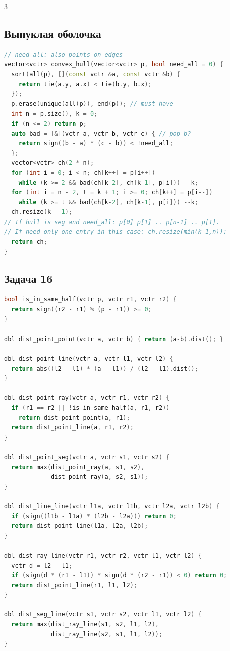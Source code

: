 \documentclass[8pt,a4paper,landscape,twosided]{extarticle}
\begin{document}
\begin{multicols*}{3}
\subsection{Выпуклая оболочка}
\begin{lstlisting}[language=C++]
// need_all: also points on edges
vector<vctr> convex_hull(vector<vctr> p, bool need_all = 0) {
  sort(all(p), [](const vctr &a, const vctr &b) {
    return tie(a.y, a.x) < tie(b.y, b.x);
  });
  p.erase(unique(all(p)), end(p)); // must have
  int n = p.size(), k = 0;
  if (n <= 2) return p;
  auto bad = [&](vctr a, vctr b, vctr c) { // pop b?
    return sign((b - a) * (c - b)) < !need_all;
  };
  vector<vctr> ch(2 * n);
  for (int i = 0; i < n; ch[k++] = p[i++])
    while (k >= 2 && bad(ch[k-2], ch[k-1], p[i])) --k;
  for (int i = n - 2, t = k + 1; i >= 0; ch[k++] = p[i--])
    while (k >= t && bad(ch[k-2], ch[k-1], p[i])) --k;
  ch.resize(k - 1);
// If hull is seg and need_all: p[0] p[1] .. p[n-1] .. p[1].
// If need only one entry in this case: ch.resize(min(k-1,n));
  return ch;
}
\end{lstlisting}

\subsection{Задача 16}
\begin{lstlisting}[language=C++]
bool is_in_same_half(vctr p, vctr r1, vctr r2) {
  return sign((r2 - r1) % (p - r1)) >= 0;
}

dbl dist_point_point(vctr a, vctr b) { return (a-b).dist(); }

dbl dist_point_line(vctr a, vctr l1, vctr l2) {
  return abs((l2 - l1) * (a - l1)) / (l2 - l1).dist();
}

dbl dist_point_ray(vctr a, vctr r1, vctr r2) {
  if (r1 == r2 || !is_in_same_half(a, r1, r2))
    return dist_point_point(a, r1);
  return dist_point_line(a, r1, r2);
}

dbl dist_point_seg(vctr a, vctr s1, vctr s2) {
  return max(dist_point_ray(a, s1, s2),
             dist_point_ray(a, s2, s1));
}

dbl dist_line_line(vctr l1a, vctr l1b, vctr l2a, vctr l2b) {
  if (sign((l1b - l1a) * (l2b - l2a))) return 0;
  return dist_point_line(l1a, l2a, l2b);
}

dbl dist_ray_line(vctr r1, vctr r2, vctr l1, vctr l2) {
  vctr d = l2 - l1;
  if (sign(d * (r1 - l1)) * sign(d * (r2 - r1)) < 0) return 0;
  return dist_point_line(r1, l1, l2);
}

dbl dist_seg_line(vctr s1, vctr s2, vctr l1, vctr l2) {
  return max(dist_ray_line(s1, s2, l1, l2),
             dist_ray_line(s2, s1, l1, l2));
}


\end{lstlisting}
\end{multicols*}
\end{document}
